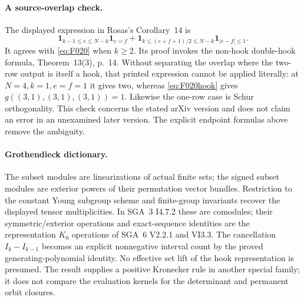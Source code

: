 \paragraph{A source-overlap check.}
The displayed expression in Rosas's Corollary~14 is
\[
 \mathbf1_{k-1\leq e\leq N-k}\mathbf1_{e=f}
  +\mathbf1_{k\leq(e+f+1)/2\leq N-k}
                         \mathbf1_{|e-f|\leq1}.
\]
It agrees with \eqref{eq:F020} when \(k\geq2\).
Its proof invokes the non-hook double-hook formula,
Theorem~13(3), p.~14. Without separating the overlap where
the two-row output is itself a hook, that printed expression
cannot be applied literally: at
\(N=4,k=1,e=f=1\) it gives two, whereas
\eqref{eq:F020hook} gives
\(g((3,1),(3,1),(3,1))=1\).
Likewise the one-row case is Schur orthogonality.
This check concerns the stated arXiv version and does not
claim an error in an unexamined later version. The explicit
endpoint formulas above remove the ambiguity.

\paragraph{Grothendieck dictionary.}
The subset modules are linearizations of actual finite sets;
the signed subset modules are exterior powers of their
permutation vector bundles. Restriction to the constant
Young subgroup scheme and finite-group invariants recover
the displayed tensor multiplicities. In SGA~3 I4.7.2 these
are comodules; their symmetric/exterior operations and
exact-sequence identities are the representation \(K_0\)
operations of SGA~6 V2.2.1 and VI3.3. The cancellation
\(I_k-I_{k-1}\) becomes an explicit nonnegative interval
count by the proved generating-polynomial identity. No
effective set lift of the hook representation is presumed.
The result supplies a positive Kronecker rule in another
special family; it does not compare the evaluation kernels
for the determinant and permanent orbit closures.
